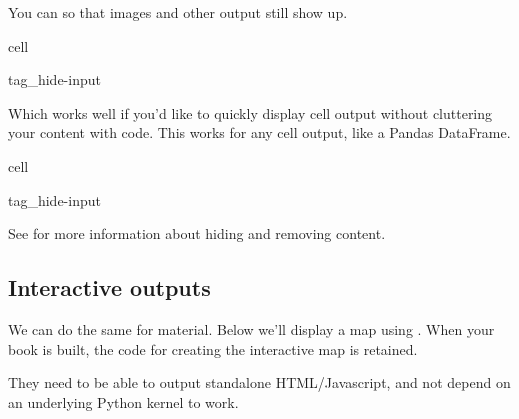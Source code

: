 \documentclass[letterpaper,10pt,english]{jupyterBook}
\begin{document}
\sphinxAtStartPar
You can  so that images and other output still show up.

\begin{sphinxuseclass}{cell}
\begin{sphinxuseclass}{tag_hide-input}
\end{sphinxuseclass}
\end{sphinxuseclass}
\sphinxAtStartPar
Which works well if you’d like to quickly display cell output without cluttering your content with code.
This works for any cell output, like a Pandas DataFrame.

\begin{sphinxuseclass}{cell}
\begin{sphinxuseclass}{tag_hide-input}
\end{sphinxuseclass}
\end{sphinxuseclass}
\sphinxAtStartPar
See  for more information about hiding and removing content.


\subsection{Interactive outputs}
\label{\detokenize{content/1_modeling/notebooks:interactive-outputs}}
\sphinxAtStartPar
We can do the same for  material. Below we’ll display a map
using . When your book is built,
the code for creating the interactive map is retained.

\begin{sphinxShadowBox}
\sphinxstylesidebartitle{}

\sphinxAtStartPar
{} They need to be able to output standalone
HTML/Javascript, and not
depend on an underlying Python kernel to work.
\end{sphinxShadowBox}
\end{document}
